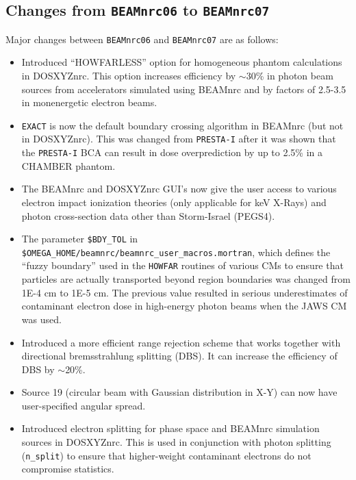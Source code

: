 \documentclass[12pt,twoside]{article}
\begin{document}
\subsection{Changes from {\tt BEAMnrc06} to {\tt BEAMnrc07}}

Major changes between {\tt BEAMnrc06} and {\tt BEAMnrc07} are
as follows:

\begin{itemize}

\item Introduced ``HOWFARLESS'' option for homogeneous phantom
calculations in DOSXYZnrc.  This option increases efficiency
by $\sim$30\% in photon beam sources from accelerators simulated
using BEAMnrc and by factors of 2.5-3.5 in monenergetic electron
beams.

\item {\tt EXACT} is now the default boundary crossing algorithm
in BEAMnrc (but not in DOSXYZnrc).  This was changed from {\tt PRESTA-I}
after it was shown\cite{WK06} that the {\tt PRESTA-I} BCA can result
in dose overprediction by up to 2.5\% in a CHAMBER phantom.

\item The BEAMnrc and DOSXYZnrc GUI's now give the user access to
various electron impact ionization theories (only applicable for
keV X-Rays) and photon cross-section data other than Storm-Israel
(PEGS4).

\item The parameter {\tt \$BDY\_TOL} in
{\tt \$OMEGA\_HOME/beamnrc/beamnrc\_user\_macros.mortran}, which defines
the ``fuzzy boundary'' used in the {\tt HOWFAR} routines of
various CMs to ensure that particles are actually transported beyond
region boundaries was changed from 1E-4 cm to 1E-5 cm.  The previous
value resulted in serious underestimates of contaminant electron dose
in high-energy photon beams when the JAWS CM was used.

\item Introduced a more efficient range rejection scheme that works
together with directional bremsstrahlung splitting (DBS).  It can
increase the efficiency of DBS by $\sim$20\%.

\item Source 19 (circular beam with Gaussian distribution in X-Y)
can now have user-specified angular spread.

\item Introduced electron splitting for phase space and BEAMnrc simulation
sources in DOSXYZnrc.  This is used in conjunction with photon splitting
({\tt n\_split}) to ensure that higher-weight contaminant electrons do not
compromise statistics.

\end{itemize}
\end{document}

